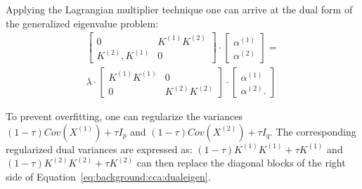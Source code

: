 Applying the Lagrangian multiplier technique one can arrive at the dual form of the generalized eigenvalue
problem:
\begin{align}\label{eq:background:cca:dualeigen}
\begin{bmatrix}
    0               & K^{(1)} K^{(2)} \\
    K^{(2)},K^{(1)} & 0
\end{bmatrix}
\cdot
\begin{bmatrix}
    \alpha^{(1)} \\
    \alpha^{(2)}
\end{bmatrix}
= \\
\lambda
\cdot
\begin{bmatrix}
    K^{(1)} K^{(1)} & 0 \\
    0 &  K^{(2)} K^{(2)}
\end{bmatrix}
\cdot
\begin{bmatrix}
    \alpha^{(1)} \\
    \alpha^{(2)}.
\end{bmatrix}
\end{align}

To prevent overfitting, one can regularize the variances $(1-\tau) Cov(X^{(1)}) + \tau I_p$ and $(1-\tau) Cov(X^({2})) + \tau I_q$.
The corresponding regularized dual variances are expressed as: $(1-\tau) K^{(1)}K^{(1)} + \tau K^{(1)}$ and $(1-\tau) K^{(2)}K^{(2)}+ \tau K^{(2)}$
can then replace the diagonal blocks of the right side of Equation~\ref{eq:background:cca:dualeigen}.

